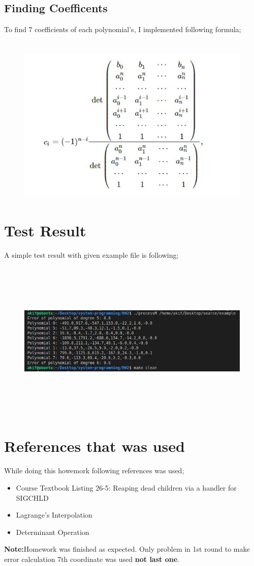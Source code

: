 \documentclass{article}
\begin{document}
\subsection{Finding Coefficents}
To find 7 coefficients of each polynomial’s, I implemented following formula; \\ \\
\begin{figure}[H]
    \centering
	\includegraphics[width=6in, height=3in]{formula.JPG}
	\caption[Optional caption]{}
	\label{}
\end{figure} 
\cleardoublepage
\section{Test Result} 
A simple test result with given example file is following;
\begin{figure}[H]
    \centering
	\includegraphics[width=6in, height=3in]{result.JPG}
	\caption[Optional caption]{}
	\label{}
\end{figure}                              
\section{References that was used} 
While doing this howemork following references was used;
\begin{itemize}
	\item Course Textbook Listing 26-5: Reaping dead children via a handler for SIGCHLD
	\item Lagrange’s Interpolation
	\item Determinant Operation
\end{itemize}
\textbf{Note:}Homework was finished as expected. Only problem in 1st round to make error calculation
7th coordinate was used \textbf{not last one}.
\end{document}
